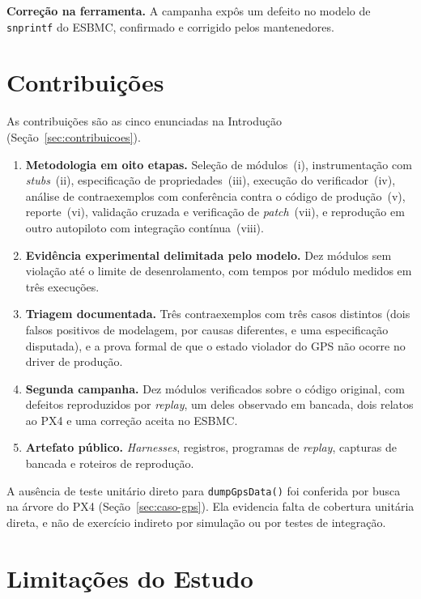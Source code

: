 \textbf{Correção na ferramenta.} A campanha expôs um defeito no modelo de
\texttt{snprintf} do ESBMC, confirmado e corrigido pelos mantenedores.

\section{Contribuições}
\label{sec:conclusao-contribuicoes}

As contribuições são as cinco enunciadas na Introdução
(Seção~\ref{sec:contribuicoes}).

\begin{enumerate}
\item \textbf{Metodologia em oito etapas.} Seleção de módulos~(i),
instrumentação com \textit{stubs}~(ii), especificação de propriedades~(iii),
execução do verificador~(iv), análise de contraexemplos com conferência contra
o código de produção~(v), reporte~(vi), validação cruzada e verificação de
\textit{patch}~(vii), e reprodução em outro autopiloto com integração
contínua~(viii).
\item \textbf{Evidência experimental delimitada pelo modelo.} Dez módulos sem
violação até o limite de desenrolamento, com tempos por módulo medidos em três
execuções.
\item \textbf{Triagem documentada.} Três contraexemplos com três casos
distintos (dois falsos positivos de modelagem, por causas diferentes, e uma especificação
disputada), e a prova formal de que o estado violador do GPS não ocorre no
driver de produção.
\item \textbf{Segunda campanha.} Dez módulos verificados sobre o código
original, com defeitos reproduzidos por \textit{replay}, um deles observado em
bancada, dois relatos ao PX4 e uma correção aceita no ESBMC.
\item \textbf{Artefato público.} \textit{Harnesses}, registros, programas de
\textit{replay}, capturas de bancada e roteiros de reprodução.
\end{enumerate}

A ausência de teste unitário direto para \texttt{dumpGpsData()} foi conferida
por busca na árvore do PX4 (Seção~\ref{sec:caso-gps}). Ela evidencia falta de
cobertura unitária direta, e não de exercício indireto por simulação ou por
testes de integração.

\section{Limitações do Estudo}
\label{sec:conclusao-limitacoes}

